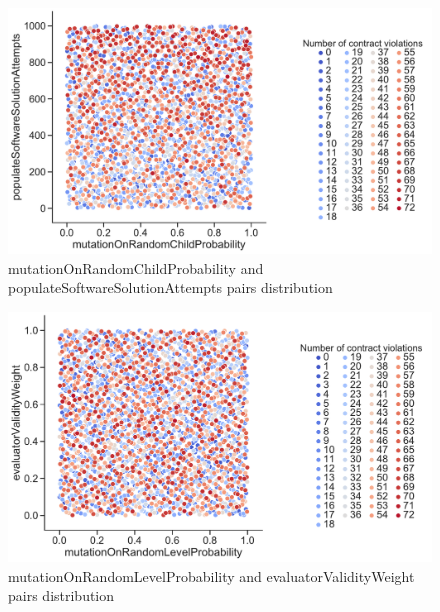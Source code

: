 \begin{figure}
	\centering
	\includegraphics[width=\textwidth]{images/PairsDistr/mutationOnRandomChildProbability_populateSoftwareSolutionAttempts.pdf}
	\caption[mutationOnRandomChildProbability and populateSoftwareSolutionAttempts pairs distribution]{mutationOnRandomChildProbability and populateSoftwareSolutionAttempts pairs distribution} 
	\label{fig:mutationOnRandomChildProbability_populateSoftwareSolutionAttempts_pair}
\end{figure}
\clearpage
\begin{figure}
	\centering
	\includegraphics[width=\textwidth]{images/PairsDistr/mutationOnRandomLevelProbability_evaluatorValidityWeight.pdf}
	\caption[mutationOnRandomLevelProbability and evaluatorValidityWeight pairs distribution]{mutationOnRandomLevelProbability and evaluatorValidityWeight pairs distribution}
	\label{fig:mutationOnRandomLevelProbability_evaluatorValidityWeight_pair}
\end{figure}
\clearpage
